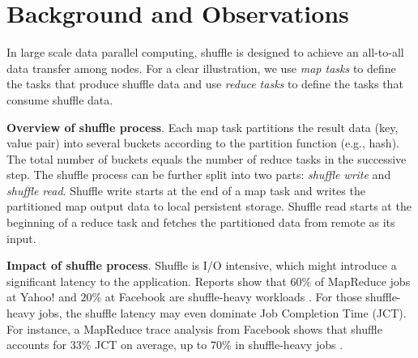 \section{Background and Observations}


In large scale data parallel computing, shuffle is designed to achieve an all-to-all data transfer among nodes. 
For a clear illustration, we use \textit{map tasks} to define the tasks that produce shuffle data and use \textit{reduce tasks} to define the tasks that consume shuffle data.

\textbf{Overview of shuffle process}. 
Each map task partitions the result data (key, value pair) into several buckets according to the partition function (e.g., hash). 
The total number of buckets equals the number of reduce tasks in the successive step.
The shuffle process can be further split into two parts: \textit{shuffle write} and \textit{shuffle read}. 
Shuffle write starts at the end of a map task and writes the partitioned map output data to local persistent storage. 
Shuffle read starts at the beginning of a reduce task and fetches the partitioned data from remote as its input. 

\textbf{Impact of shuffle process}. Shuffle is I/O intensive, which might introduce a significant latency to the application. 
Reports show that $60\%$ of MapReduce jobs at Yahoo! and $20\%$ at Facebook are shuffle-heavy workloads \cite{shufflewatcher}. 
For those shuffle-heavy jobs, the shuffle latency may even dominate Job Completion Time (JCT).
For instance, a MapReduce trace analysis from Facebook shows that shuffle accounts for $33\%$ JCT on average, up to $70\%$ in shuffle-heavy jobs \cite{managing}.

